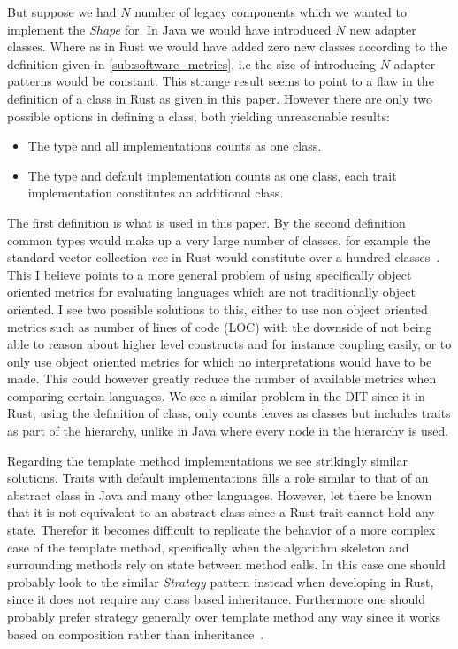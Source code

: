 \documentclass[conference]{IEEEtran}
\begin{document}
But suppose we had $N$ number of legacy components which we wanted to implement the \emph{Shape} for. 
In Java we would have introduced $N$ new adapter classes.
Where as in Rust we would have added zero new classes according to the definition given in \autoref{sub:software_metrics}, i.e the size of introducing $N$ adapter patterns would be constant.
This strange result seems to point to a flaw in the definition of a class in Rust as given in this paper.
However there are only two possible options in defining a class, both yielding unreasonable results:
\begin{itemize}
    \item The type and all implementations counts as one class.
    \item The type and default implementation counts as one class, each trait implementation constitutes an additional class.
\end{itemize}
The first definition is what is used in this paper.
By the second definition common types would make up a very large number of classes, for example the standard vector collection \emph{vec} in Rust would constitute over a hundred classes~\cite{rustdoc:vec}.
This I believe points to a more general problem of using specifically object oriented metrics for evaluating languages which are not traditionally object oriented.
I see two possible solutions to this, either to use non object oriented metrics such as number of lines of code (LOC) with the downside of not being able to reason about higher level constructs and for instance coupling easily, or to only use object oriented metrics for which no interpretations would have to be made.
This could however greatly reduce the number of available metrics when comparing certain languages.
We see a similar problem in the DIT since it in Rust, using the definition of class, only counts leaves as classes but includes traits as part of the hierarchy, unlike in Java where every node in the hierarchy is used.

Regarding the template method implementations we see strikingly similar solutions.
Traits with default implementations fills a role similar to that of an abstract class in Java and many other languages.
However, let there be known that it is not equivalent to an abstract class since a Rust trait cannot hold any state.
Therefor it becomes difficult to replicate the behavior of a more complex case of the template method, specifically when the algorithm skeleton and surrounding methods rely on state between method calls.
In this case one should probably look to the similar \emph{Strategy} pattern instead when developing in Rust, since it does not require any class based inheritance.
Furthermore one should probably prefer strategy generally over template method any way since it works based on composition rather than inheritance~\cite[p.32]{gamma1993:gof}.
\end{document}
